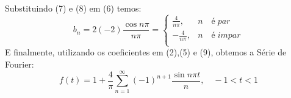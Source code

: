 \documentclass[12pt]{article}
\begin{document}
\begin{enumerate}[label=S.]
\begin{equation}
\begin{split}
    \end{split}\end{equation}
    Substituindo (7) e (8) em (6) temos:
    \begin{equation}
    b_{n} = 2(-2)\frac{\cos n\pi}{n\pi} = 
    \begin{cases}
    \frac{4}{n\pi} , & n \quad é\;  par\\
    - \frac{4}{n\pi}, & n \quad é\; impar\\
    \end{cases}
    \end{equation}
    E finalmente, utilizando os coeficientes em (2),(5) e (9), obtemos a Série de Fourier:
    \begin{equation}
    f(t) = 1 + \frac{4}{\pi} \sum_{n=1}^{\infty} (-1)^{n+1} \frac{\sin n\pi t}{n}, \quad -1< t <1 
    \end{equation}
\end{enumerate}
\end{document}
